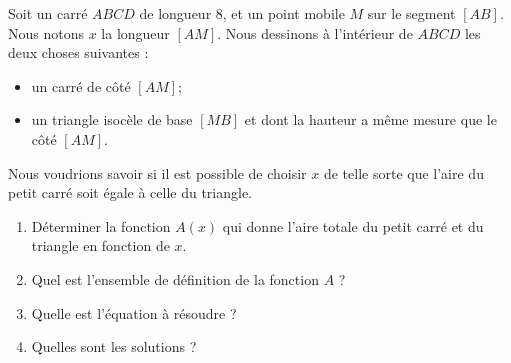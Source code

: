 
\begin{exercice}\label{exosmath-0078}
 
    Soit un carré \( ABCD\) de longueur \unit{8}{\centi\meter}, et un point mobile \( M\) sur le segment \( [AB]\). Nous notons \( x\) la longueur \( [AM]\). Nous dessinons à l'intérieur de \( ABCD\) les deux choses suivantes :
    \begin{itemize}
        \item un carré de côté \( [AM]\);
        \item
            un triangle isocèle de base \( [MB]\) et dont la hauteur a même mesure que le côté \( [AM]\).
    \end{itemize}
    Nous voudrions savoir si il est possible de choisir \( x\) de telle sorte que l'aire du petit carré soit égale à celle du triangle.
    \begin{enumerate}
        \item
            Déterminer la fonction \( A(x)\) qui donne l'aire totale du petit carré et du triangle en fonction de \( x\).
        \item
            Quel est l'ensemble de définition de la fonction \( A\) ?
        \item
            Quelle est l'équation à résoudre ?
        \item
            Quelles sont les solutions ?
    \end{enumerate}

\end{exercice}
